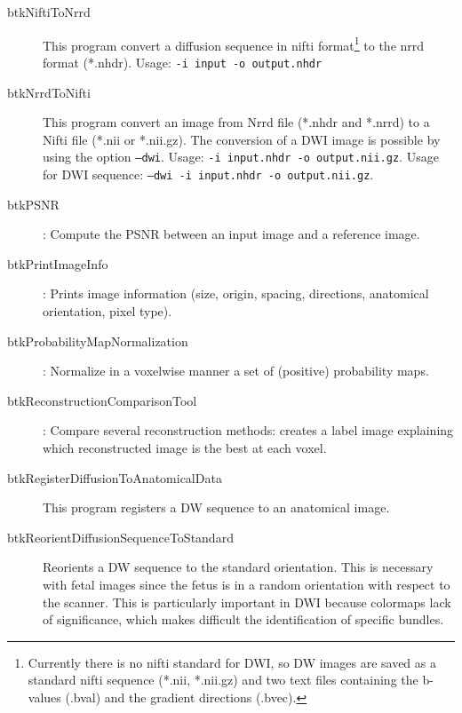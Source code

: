 \begin{description}
\item[btkNiftiToNrrd] This program convert a diffusion sequence in nifti
format\footnote{Currently there is no nifti standard for DWI, so DW images are
saved as a standard nifti sequence (*.nii, *.nii.gz) and two text files
containing the b-values (.bval) and the gradient directions (.bvec).}  to the
nrrd format (*.nhdr). Usage: \texttt{-i input -o output.nhdr}

\item[btkNrrdToNifti] This program convert an image from Nrrd file (*.nhdr and *.nrrd) to a Nifti file (*.nii or *.nii.gz). The conversion of a DWI image is possible by using the option \texttt{--dwi}. Usage: \texttt{-i input.nhdr -o output.nii.gz}. Usage for DWI sequence: \texttt{--dwi -i input.nhdr -o output.nii.gz}.
\item[btkPSNR]: Compute the PSNR between an input image and a reference image.%
\item[btkPrintImageInfo]: Prints image information (size, origin, spacing, directions, anatomical orientation, pixel type).
\item[btkProbabilityMapNormalization]: Normalize in a voxelwise manner a set of (positive) probability maps. 
\item[btkReconstructionComparisonTool]: Compare several reconstruction methods: creates a label image explaining which reconstructed image is the best at each voxel.
\item[btkRegisterDiffusionToAnatomicalData] This program registers a DW
sequence to an anatomical image. 

\item[btkReorientDiffusionSequenceToStandard] Reorients a DW sequence
to the standard orientation. This is necessary with fetal images since the fetus
is in a random orientation with respect to the scanner. This is particularly
important in DWI because colormaps lack of significance, which makes difficult
the identification of specific bundles.


\end{description}
